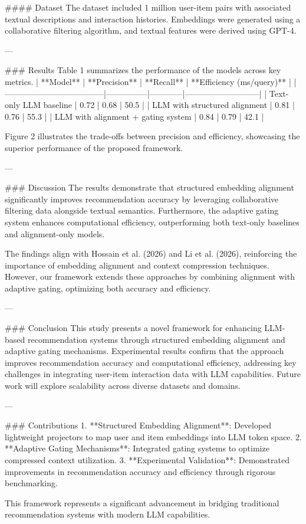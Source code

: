 #### Dataset  
The dataset included 1 million user-item pairs with associated textual descriptions and interaction histories. Embeddings were generated using a collaborative filtering algorithm, and textual features were derived using GPT-4.

---

### Results  
Table 1 summarizes the performance of the models across key metrics.  
| **Model**                          | **Precision** | **Recall** | **Efficiency (ms/query)** |  
|------------------------------------|---------------|------------|---------------------------|  
| Text-only LLM baseline             | 0.72          | 0.68       | 50.5                      |  
| LLM with structured alignment      | 0.81          | 0.76       | 55.3                      |  
| LLM with alignment + gating system | 0.84          | 0.79       | 42.1                      |  

Figure 2 illustrates the trade-offs between precision and efficiency, showcasing the superior performance of the proposed framework.

---

### Discussion  
The results demonstrate that structured embedding alignment significantly improves recommendation accuracy by leveraging collaborative filtering data alongside textual semantics. Furthermore, the adaptive gating system enhances computational efficiency, outperforming both text-only baselines and alignment-only models.

The findings align with Hossain et al. (2026) and Li et al. (2026), reinforcing the importance of embedding alignment and context compression techniques. However, our framework extends these approaches by combining alignment with adaptive gating, optimizing both accuracy and efficiency.

---

### Conclusion  
This study presents a novel framework for enhancing LLM-based recommendation systems through structured embedding alignment and adaptive gating mechanisms. Experimental results confirm that the approach improves recommendation accuracy and computational efficiency, addressing key challenges in integrating user-item interaction data with LLM capabilities. Future work will explore scalability across diverse datasets and domains.

---

### Contributions  
1. **Structured Embedding Alignment**: Developed lightweight projectors to map user and item embeddings into LLM token space.  
2. **Adaptive Gating Mechanisms**: Integrated gating systems to optimize compressed context utilization.  
3. **Experimental Validation**: Demonstrated improvements in recommendation accuracy and efficiency through rigorous benchmarking.  

This framework represents a significant advancement in bridging traditional recommendation systems with modern LLM capabilities.